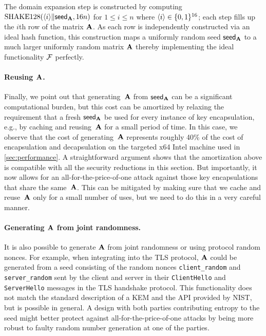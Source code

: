 The domain expansion step is constructed
by computing $\textrm{\upshape\mdseries SHAKE}128(\langle i\rangle \| {\mathsf{seed}_{\mathbf{A}}}, 16n)$ for $1 \leq i \leq n$
where $\langle i\rangle \in \{0,1\}^{16}$; each step fills up the $i$th row of the matrix $\mathbf{A}$. As each row is
independently constructed via an ideal hash function, this construction maps
a uniformly random seed ${\mathsf{seed}_{\mathbf{A}}}$ to a much larger uniformly random matrix $\mathbf{A}$
thereby implementing the ideal functionality $\mathcal{F}$ perfectly.

\paragraph{Reusing $\mathbf{A}$.}

Finally, we point out that generating~$\mathbf{A}$ from
${\mathsf{seed}_{\mathbf{A}}}$ can be a significant computational burden, but this
cost can be amortized by relaxing the requirement that a fresh
${\mathsf{seed}_{\mathbf{A}}}$ be used for every instance of key encapsulation, e.g., by
caching and reusing~$\mathbf{A}$ for a small period of time. In this case,
we observe that the cost of generating~$\mathbf{A}$ represents roughly 40\% of the cost
of encapsulation and decapsulation on the targeted x64 Intel machine used in 
\autoref{sec:performance}. 
A straightforward argument shows that the amortization above is compatible with all the security
reductions in this section.  But importantly, it now allows for an
all-for-the-price-of-one attack against those key encapsulations that share
the same~$\mathbf{A}$. This can be mitigated by making sure that we cache and
reuse~$\mathbf{A}$ only for a small number of uses, but we need to do this
in a very careful manner.

\paragraph{Generating $\mathbf{A}$ from joint randomness.}
It is also possible to generate $\mathbf{A}$ from joint randomness or using protocol
random nonces.  For example, when integrating \FrodoKEM into the TLS protocol,
$\mathbf{A}$ could be generated from a seed consisting of the random nonces \texttt{client\_random}
and \texttt{server\_random} sent by the client and server in their
\texttt{ClientHello} and \texttt{ServerHello} messages in the TLS handshake protocol.  
This functionality does not match the standard
description of a KEM and the API provided by NIST, but is possible in general.
A design with both parties contributing entropy to the seed might better
protect against all-for-the-price-of-one attacks by being more robust to
faulty
random number generation at one of the parties.

